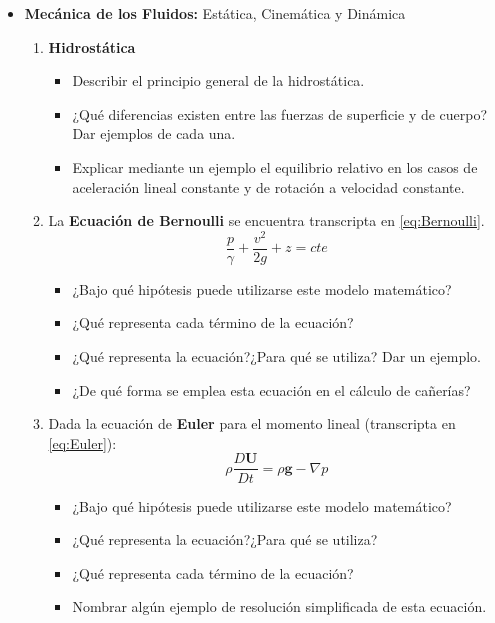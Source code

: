 \begin{itemize}
 \item {\bf Mecánica de los Fluidos:} Estática, Cinemática y Dinámica
    \begin{enumerate}
    
  \item {\bf Hidrostática}
	\begin{itemize} 
	\item Describir el principio general de la hidrostática.
	\item ¿Qué diferencias existen entre las fuerzas de superficie y de cuerpo? Dar ejemplos de cada una.
	\item Explicar mediante un ejemplo el equilibrio relativo en los casos de aceleración lineal constante y
	de rotación a velocidad constante.
	\end{itemize}


      \item La {\bf Ecuación de Bernoulli} se encuentra transcripta en \ref{eq:Bernoulli}.
	\begin{equation}\label{eq:Bernoulli}
	\frac{p}{\gamma}+	%
	\frac{v^2}{2g}+	%
	z=\mathit{cte} 		%
	\end{equation}

	\begin{itemize}
	\item ¿Bajo qué hipótesis puede utilizarse este modelo matemático?
	\item ¿Qué representa cada término de la ecuación?
	\item ¿Qué representa la ecuación?¿Para qué se utiliza? Dar un ejemplo.
	\item ¿De qué forma se emplea esta ecuación en el cálculo de cañerías?
	\end{itemize}

      \item Dada la ecuación de {\bf Euler} para el momento lineal (transcripta en \ref{eq:Euler}):
      \begin{equation}\label{eq:Euler}
      \rho \frac{D\mathbf{U}}{Dt}=	%
      \rho \mathbf{g}		%
      - \nabla p 			%
      \end{equation}
      \begin{itemize}
      \item ¿Bajo qué hipótesis puede utilizarse este modelo matemático?
      \item ¿Qué representa la ecuación?¿Para qué se utiliza?
      \item ¿Qué representa cada término de la ecuación?
      \item Nombrar algún ejemplo de resolución simplificada de esta ecuación.
      \end{itemize}


\end{enumerate}
\end{itemize}
